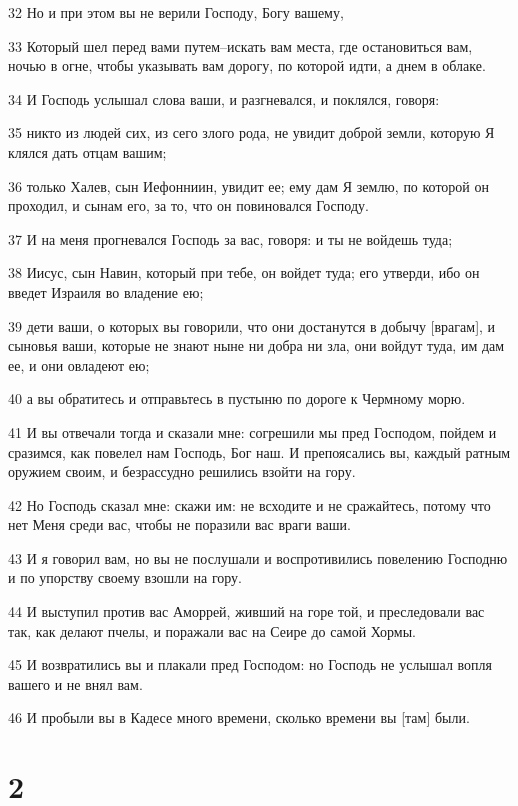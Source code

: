 \par 32 Но и при этом вы не верили Господу, Богу вашему,
\par 33 Который шел перед вами путем--искать вам места, где остановиться вам, ночью в огне, чтобы указывать вам дорогу, по которой идти, а днем в облаке.
\par 34 И Господь услышал слова ваши, и разгневался, и поклялся, говоря:
\par 35 никто из людей сих, из сего злого рода, не увидит доброй земли, которую Я клялся дать отцам вашим;
\par 36 только Халев, сын Иефонниин, увидит ее; ему дам Я землю, по которой он проходил, и сынам его, за то, что он повиновался Господу.
\par 37 И на меня прогневался Господь за вас, говоря: и ты не войдешь туда;
\par 38 Иисус, сын Навин, который при тебе, он войдет туда; его утверди, ибо он введет Израиля во владение ею;
\par 39 дети ваши, о которых вы говорили, что они достанутся в добычу [врагам], и сыновья ваши, которые не знают ныне ни добра ни зла, они войдут туда, им дам ее, и они овладеют ею;
\par 40 а вы обратитесь и отправьтесь в пустыню по дороге к Чермному морю.
\par 41 И вы отвечали тогда и сказали мне: согрешили мы пред Господом, пойдем и сразимся, как повелел нам Господь, Бог наш. И препоясались вы, каждый ратным оружием своим, и безрассудно решились взойти на гору.
\par 42 Но Господь сказал мне: скажи им: не всходите и не сражайтесь, потому что нет Меня среди вас, чтобы не поразили вас враги ваши.
\par 43 И я говорил вам, но вы не послушали и воспротивились повелению Господню и по упорству своему взошли на гору.
\par 44 И выступил против вас Аморрей, живший на горе той, и преследовали вас так, как делают пчелы, и поражали вас на Сеире до самой Хормы.
\par 45 И возвратились вы и плакали пред Господом: но Господь не услышал вопля вашего и не внял вам.
\par 46 И пробыли вы в Кадесе много времени, сколько времени вы [там] были.

\chapter{2}

